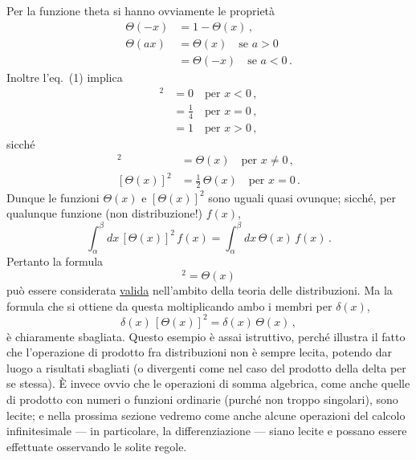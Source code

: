 \documentclass[11pt, a4paper]{book}
\numberwithin{equation}{section}
\begin{document}
Per la funzione theta si hanno ovviamente le proprietà
\begin{align}
\Theta(-x) &= 1 - \Theta(x) \,, \tag{17} \\
\Theta(ax) &= \Theta(x) \quad \text{se } a > 0 \nonumber \\
&= \Theta(-x) \quad \text{se } a < 0 \,. \tag{18}
\end{align}
Inoltre l'eq.~(1) implica
\begin{align}
[\Theta(x)]^2 &= 0 \quad \text{per } x < 0 \,, \tag{19a} \\
&= \frac{1}{4} \quad \text{per } x = 0 \,, \tag{19b} \\
&= 1 \quad \text{per } x > 0 \,, \tag{19c}
\end{align}
sicché
\begin{align}
[\Theta(x)]^2 &= \Theta(x) \quad \text{per } x \neq 0 \,, \tag{20a} \\
[\Theta(x)]^2 &= \frac{1}{2}\,\Theta(x) \quad \text{per } x = 0 \,. \tag{20b}
\end{align}
Dunque le funzioni $\Theta(x)$ e $[\Theta(x)]^2$ sono uguali quasi ovunque; sicché, per qualunque funzione (non distribuzione!) $f(x)$,
\begin{equation}
\int_{\alpha}^{\beta} dx\, [\Theta(x)]^2\, f(x) = \int_{\alpha}^{\beta} dx\, \Theta(x)\, f(x) \,. \tag{21}
\end{equation}
Pertanto la formula
\begin{equation}
[\Theta(x)]^2 = \Theta(x) \tag{22}
\end{equation}
può essere considerata \uline{valida} nell'ambito della teoria delle distribuzioni. Ma la formula che si ottiene da questa moltiplicando ambo i membri per $\delta(x)$,
\[
\delta(x)\,[\Theta(x)]^2 = \delta(x)\,\Theta(x) \,,
\]
è chiaramente sbagliata. Questo esempio è assai istruttivo, perché illustra il fatto che l'operazione di prodotto fra distribuzioni non è sempre lecita, potendo dar luogo a risultati sbagliati (o divergenti come nel caso del prodotto della delta per se stessa). È invece ovvio che le operazioni di somma algebrica, come anche quelle di prodotto con numeri o funzioni ordinarie (purché non troppo singolari), sono lecite; e nella prossima sezione vedremo come anche alcune operazioni del calcolo infinitesimale --- in particolare, la differenziazione --- siano lecite e possano essere effettuate osservando le solite regole.
\end{document}
